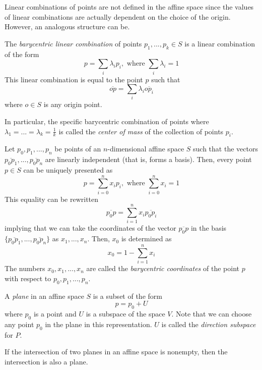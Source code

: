 \documentclass{article}
\begin{document}
    Linear combinations of points are not defined in the affine space since the values of linear combinations are actually dependent on the choice of the origin. However, an analogous structure can be. 

    \begin{definition}
    The \textit{barycentric linear combination} of points $p_1, ..., p_k \in S$ is a linear combination of the form
    \[p = \sum_i \lambda_i p_i, \text{ where } \sum_i \lambda_i = 1\]
    This linear combination is equal to the point $p$ such that
    \[\overline{op} = \sum_i \lambda_i \overline{op_i}\]
    where $o \in S$ is any origin point.
    \end{definition}

    \begin{definition}
    In particular, the specific barycentric combination of points where $\lambda_1 = ... = \lambda_k = \frac{1}{k}$ is called the \textit{center of mass} of the collection of points $p_i$. 
    \end{definition}

    \begin{definition}
    Let $p_0, p_1, ..., p_n$ be points of an $n$-dimensional affine space $S$ such that the vectors $\overline{p_0 p_1}, ..., \overline{p_0 p_n}$ are linearly independent (that is, forms a basis). Then, every point $p \in S$ can be uniquely presented as 
    \[p = \sum_{i=0}^n x_i p_i, \text{ where } \sum_{i=0}^n x_i = 1\]
    This equality can be rewritten
    \[\overline{p_0 p} = \sum_{i=1}^n x_i \overline{p_0 p_i}\]
    implying that we can take the coordinates of the vector $\overline{p_0 p}$ in the basis $\{ \overline{p_0 p_1}, ..., \overline{p_0 p_n}\}$ as $x_1, ..., x_n$. Then, $x_0$ is determined as 
    \[x_0 = 1 - \sum_{i=1}^n x_i\]
    The numbers $x_0, x_1, ..., x_n$ are called the \textit{barycentric coordinates} of the point $p$ with respect to $p_0, p_1, ..., p_n$. 
    \end{definition}

    \begin{definition}
    A \textit{plane} in an affine space $S$ is a subset of the form 
    \[p = p_0 + U\]
    where $p_0$ is a point and $U$ is a subspace of the space $V$. Note that we can choose any point $p_0$ in the plane in this representation. $U$ is called the \textit{direction subspace} for $P$. 
    \end{definition}

    \begin{lemma}
    If the intersection of two planes in an affine space is nonempty, then the intersection is also a plane. 
    \end{lemma}
\end{document}
